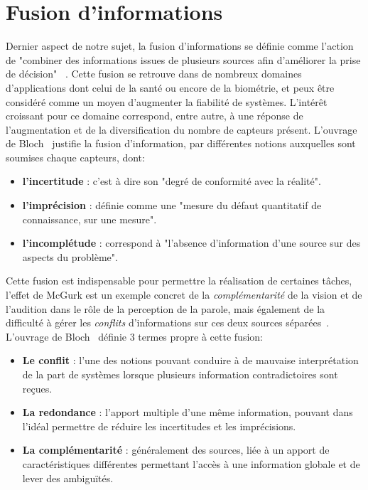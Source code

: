 \clearpage

\section{Fusion d’informations}
Dernier aspect de notre sujet, la fusion d’informations se définie comme l’action de "combiner des informations issues de plusieurs sources afin d’améliorer la prise de décision" ~\cite{Bloch2003}. Cette fusion se retrouve dans de nombreux domaines d'applications dont celui de la santé ou encore de la biométrie, et peux être considéré comme un moyen d'augmenter la fiabilité de systèmes. L'intérêt croissant pour ce domaine correspond, entre autre, à une réponse de l'augmentation et de la diversification du nombre de capteurs présent. L'ouvrage de Bloch~\cite{Bloch2003} justifie la fusion d'information, par différentes notions auxquelles sont soumises chaque capteurs, dont:
\begin{itemize}
    \item \textbf{l'incertitude} : c'est à dire son "degré de conformité avec la réalité".
    \item \textbf{l'imprécision} : définie comme une "mesure du défaut quantitatif de connaissance, sur une mesure".
    \item \textbf{l'incomplétude} : correspond à "l'absence d'information d'une source sur des aspects du problème".
\end{itemize}\par

Cette fusion est indispensable pour permettre la réalisation de certaines tâches, l'effet de McGurk est un exemple concret de la \textit{complémentarité} de la vision et de l'audition dans le rôle de la perception de la parole, mais également de la difficulté à gérer les \textit{conflits} d'informations sur ces deux sources séparées~\cite{Mcgurk1976}. L'ouvrage de Bloch~\cite{Bloch2003} définie 3 termes propre à cette fusion:
\begin{itemize}
    \item \textbf{Le conflit} : l'une des notions pouvant conduire à de mauvaise interprétation de la part de systèmes lorsque plusieurs information contradictoires sont reçues.
    \item \textbf{La redondance} : l'apport multiple d'une même information, pouvant dans l'idéal permettre de réduire les incertitudes et les imprécisions.
    \item \textbf{La complémentarité} : généralement des sources, liée à un apport de caractéristiques différentes permettant l'accès à une information globale et de lever des ambiguïtés.
\end{itemize}\par

